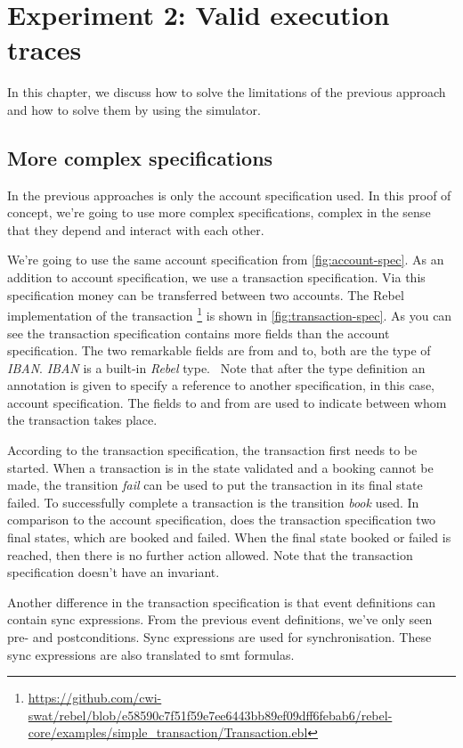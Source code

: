 \chapter{Experiment 2: Valid execution traces}\label{sec:ch5}

In this chapter, we discuss how to solve the limitations of the previous
approach and how to solve them by using the simulator.

\section{More complex specifications}\label{sec:ch5-complex-spec}
In the previous approaches is only the account specification used. In this proof
of concept, we're going to use more complex specifications, complex in the sense
that they depend and interact with each other.

We're going to use the
same account specification from \autoref{fig:account-spec}. As an addition to
account specification, we use a transaction specification. Via this
specification money can be transferred between two accounts.
The Rebel implementation of the transaction \footnote{\url{https://github.com/cwi-swat/rebel/blob/e58590c7f51f59e7ee6443bb89ef09dff6febab6/rebel-core/examples/simple_transaction/Transaction.ebl}} is shown in \autoref{fig:transaction-spec}.
As you can see the transaction specification contains more fields than the
account specification. The two remarkable fields are from and to, both are the
type of \textit{IBAN}. \textit{IBAN} is a built-in \textit{Rebel}
type.~\cite[p.~3]{stoel_storm_vinju_bosman_2016} Note that after the type
definition an annotation is given to specify a reference to another
specification, in this case, account specification. The fields to and from are
used to indicate between whom the transaction takes place.

According to the transaction specification, the transaction first
needs to be started. When a transaction is in the state validated and a booking
cannot be made, the transition \textit{fail} can be used to put the transaction in its
final state failed. To successfully complete a transaction is the transition
\textit{book} used. In comparison to the account specification, does the transaction
specification two final states, which are booked and failed. When the final
state booked or failed is reached, then there is no further action allowed.
Note that the transaction specification doesn't have an invariant.

Another difference in the transaction specification is that event definitions
can contain sync expressions. From the previous event definitions, we've only
seen pre- and postconditions. Sync expressions are used for synchronisation.
These sync expressions are also translated to \gls{smt} formulas.

